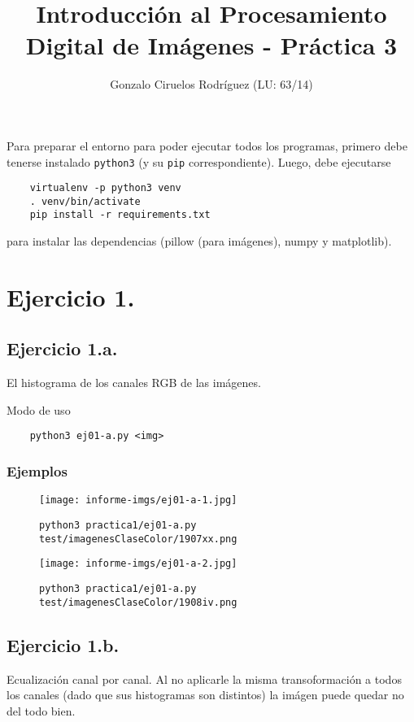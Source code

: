\documentclass[11pt, spanish]{article}
\title{Introducción al Procesamiento Digital de Imágenes - Práctica 3}
\date{}
\author{Gonzalo Ciruelos Rodríguez (LU: 63/14)}
\begin{document}
\maketitle

Para preparar el entorno para poder ejecutar todos los programas,
primero debe tenerse instalado \texttt{python3} (y su \texttt{pip} correspondiente).
Luego, debe ejecutarse 
\begin{verbatim}
    virtualenv -p python3 venv 
    . venv/bin/activate
    pip install -r requirements.txt 
\end{verbatim}

\noindent para instalar las dependencias (pillow (para imágenes), numpy y matplotlib).



\section{Ejercicio 1.}
\subsection{Ejercicio 1.a.}

El histograma de los canales RGB de las imágenes.

Modo de uso
\begin{verbatim}
    python3 ej01-a.py <img>
\end{verbatim}

\subsubsection*{Ejemplos}
\begin{figure}[H]
\centering
  \texttt{[image: informe-imgs/ej01-a-1.jpg]}
  \caption{\texttt{python3 practica1/ej01-a.py test/imagenesClaseColor/1907xx.png}}
\end{figure}
\begin{figure}[H]
\centering
  \texttt{[image: informe-imgs/ej01-a-2.jpg]}
  \caption{\texttt{python3 practica1/ej01-a.py test/imagenesClaseColor/1908iv.png}}
\end{figure}


\subsection{Ejercicio 1.b.}

Ecualización canal por canal.
Al no aplicarle la misma transoformación a todos los canales (dado que sus histogramas son distintos)
la imágen puede quedar no del todo bien.
\end{document}
